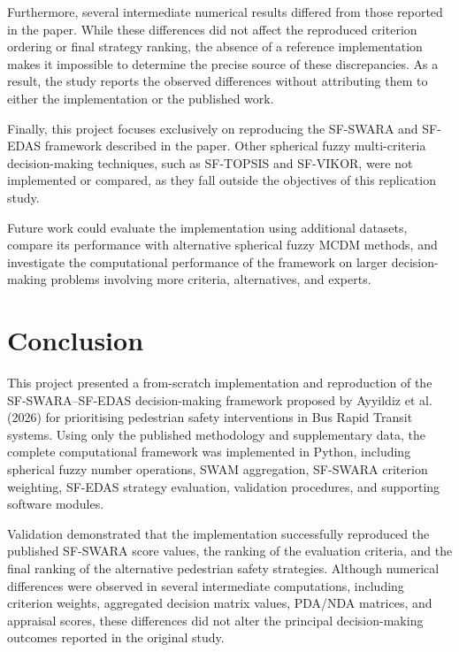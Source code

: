 \documentclass[11pt]{article}
\begin{document}
Furthermore, several intermediate numerical results differed from those reported in the paper. While these differences did not affect the reproduced criterion ordering or final strategy ranking, the absence of a reference implementation makes it impossible to determine the precise source of these discrepancies. As a result, the study reports the observed differences without attributing them to either the implementation or the published work.

Finally, this project focuses exclusively on reproducing the SF-SWARA and SF-EDAS framework described in the paper. Other spherical fuzzy multi-criteria decision-making techniques, such as SF-TOPSIS and SF-VIKOR, were not implemented or compared, as they fall outside the objectives of this replication study.

Future work could evaluate the implementation using additional datasets, compare its performance with alternative spherical fuzzy MCDM methods, and investigate the computational performance of the framework on larger decision-making problems involving more criteria, alternatives, and experts.

\section{Conclusion}
This project presented a from-scratch implementation and reproduction of the SF-SWARA--SF-EDAS decision-making framework proposed by Ayyildiz et al. (2026) for prioritising pedestrian safety interventions in Bus Rapid Transit systems. Using only the published methodology and supplementary data, the complete computational framework was implemented in Python, including spherical fuzzy number operations, SWAM aggregation, SF-SWARA criterion weighting, SF-EDAS strategy evaluation, validation procedures, and supporting software modules.

Validation demonstrated that the implementation successfully reproduced the published SF-SWARA score values, the ranking of the evaluation criteria, and the final ranking of the alternative pedestrian safety strategies. Although numerical differences were observed in several intermediate computations, including criterion weights, aggregated decision matrix values, PDA/NDA matrices, and appraisal scores, these differences did not alter the principal decision-making outcomes reported in the original study.
\end{document}

